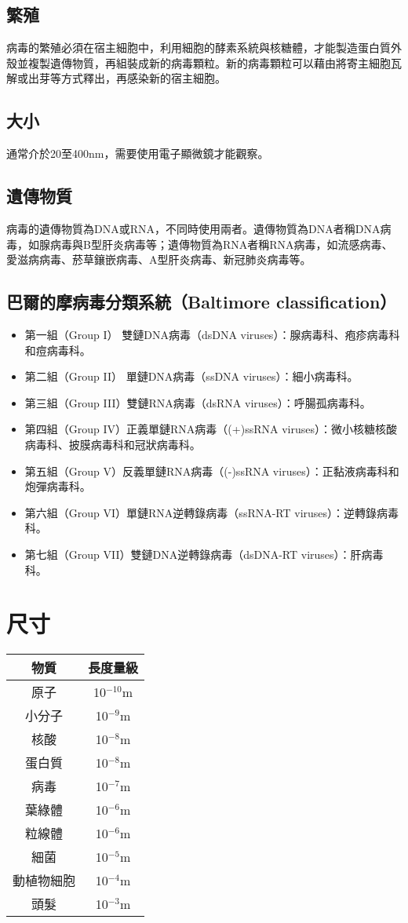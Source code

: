 \documentclass[a4paper,12pt]{report}
\begin{document}
\subsection{繁殖}
病毒的繁殖必須在宿主細胞中，利用細胞的酵素系統與核糖體，才能製造蛋白質外殼並複製遺傳物質，再組裝成新的病毒顆粒。新的病毒顆粒可以藉由將寄主細胞瓦解或出芽等方式釋出，再感染新的宿主細胞。
\subsection{大小}
通常介於20至400nm，需要使用電子顯微鏡才能觀察。
\subsection{遺傳物質}
病毒的遺傳物質為DNA或RNA，不同時使用兩者。遺傳物質為DNA者稱DNA病毒，如腺病毒與B型肝炎病毒等；遺傳物質為RNA者稱RNA病毒，如流感病毒、愛滋病病毒、菸草鑲嵌病毒、A型肝炎病毒、新冠肺炎病毒等。
\subsection{巴爾的摩病毒分類系統（Baltimore classification）}
\begin{itemize}
\item 第一組（Group I） 雙鏈DNA病毒（dsDNA viruses）：腺病毒科、疱疹病毒科和痘病毒科。
\item 第二組（Group II） 單鏈DNA病毒（ssDNA viruses）：細小病毒科。
\item 第三組（Group III）雙鏈RNA病毒（dsRNA viruses）：呼腸孤病毒科。
\item 第四組（Group IV）正義單鏈RNA病毒（(+)ssRNA viruses）：微小核糖核酸病毒科、披膜病毒科和冠狀病毒科。
\item 第五組（Group V）反義單鏈RNA病毒（(-)ssRNA viruses）：正黏液病毒科和炮彈病毒科。
\item 第六組（Group VI）單鏈RNA逆轉錄病毒（ssRNA-RT viruses）：逆轉錄病毒科。
\item 第七組（Group VII）雙鏈DNA逆轉錄病毒（dsDNA-RT viruses）：肝病毒科。
\end{itemize}
\section{尺寸}
\bct\bfH\ctr\begin{tabular}{|c|c|}
\hline
物質 & 長度量級 \\\hline
原子 & 10$^{-10}$m \\\hline
小分子 & 10$^{-9}$m \\\hline
核酸 & 10$^{-8}$m \\\hline
蛋白質 & 10$^{-8}$m \\\hline
病毒 & 10$^{-7}$m \\\hline
葉綠體 & 10$^{-6}$m \\\hline
粒線體 & 10$^{-6}$m \\\hline
細菌 & 10$^{-5}$m \\\hline
動植物細胞 & 10$^{-4}$m \\\hline
頭髮 & 10$^{-3}$m \\\hline
\end{tabular}\ef\FB\ect
\end{document}
